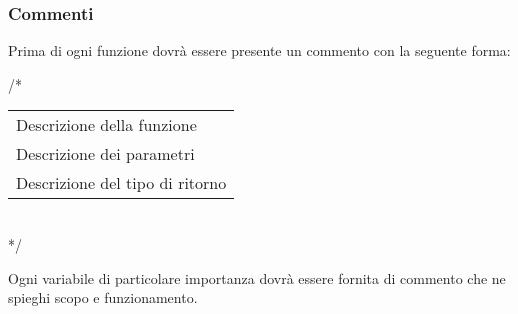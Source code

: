 \subsubsection{Commenti}

Prima di ogni funzione dovrà essere presente un commento con la seguente forma:

\begin{flushleft}
/*\\
\vspace{3mm}
\begin{tabular}{l}
	Descrizione della funzione\\
	Descrizione dei parametri\\		
	Descrizione del tipo di ritorno\\
\end{tabular}\\
\vspace{3mm}
*/

\end{flushleft}

Ogni variabile di particolare importanza dovrà essere fornita di commento che ne spieghi scopo e funzionamento.

